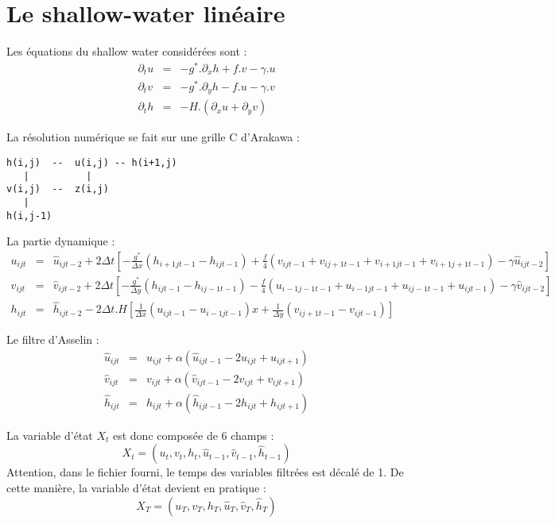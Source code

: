 \documentclass[a4paper,12pt]{article}
\begin{document}
\section{Le shallow-water linéaire\label{sec:lin}}
Les équations du shallow water considérées sont :
\begin{eqnarray}
\partial_tu & = & -g^*.\partial_xh + f . v - \gamma . u \nonumber \\
\partial_tv & = & -g^*.\partial_yh - f . u - \gamma . v \label{shal-lin}\\
\partial_th & = & - H.(\partial_xu + \partial_yv) \nonumber
\end{eqnarray}

La résolution numérique se fait sur une grille C d'Arakawa  :
\begin{verbatim}
h(i,j)  --  u(i,j) -- h(i+1,j)
   |          |
v(i,j)  --  z(i,j)
   |
h(i,j-1) 
\end{verbatim}

La partie dynamique :
\begingroup\footnotesize
\begin{eqnarray*}
u_{ijt} & = & \hat{u}_{ijt-2}+2\Delta t \left [
  -\frac{g^*}{\Delta x} (h_{i+1jt-1} - h_{ijt-1})
  +\frac{f  }{4}        (v_{ijt-1}+v_{ij+1t-1}+v_{i+1jt-1}+v_{i+1j+1t-1})
  -\gamma                \hat{u}_{ijt-2} \right ]\\
v_{ijt} & = & \hat{v}_{ijt-2}+2\Delta t \left [
  -\frac{g^*}{\Delta y} (h_{ijt-1} - h_{ij-1t-1})
  -\frac{f  }{4}        (u_{i-1j-1t-1}+u_{i-1jt-1}+u_{ij-1t-1}+u_{ijt-1})
  -\gamma                \hat{v}_{ijt-2} \right ]\\
h_{ijt} & = & \hat{h}_{ijt-2}-2\Delta t . H \left [ 
    \frac{1}{\Delta x} (u_{ijt-1} - u_{i-1jt-1}) 
x  + \frac{1}{\Delta y} (v_{ij+1t-1} - v_{ijt-1}) \right ]
\end{eqnarray*}
\endgroup

Le filtre d'Asselin :
\begin{eqnarray*}
\hat{u}_{ijt} & = & u_{ijt} + \alpha(\hat{u}_{ijt-1} - 2 u_{ijt} + u_{ijt+1}) \\
\hat{v}_{ijt} & = & v_{ijt} + \alpha(\hat{v}_{ijt-1} - 2 v_{ijt} + v_{ijt+1}) \\
\hat{h}_{ijt} & = & h_{ijt} + \alpha(\hat{h}_{ijt-1} - 2 h_{ijt} + h_{ijt+1})
\end{eqnarray*}


La variable d'état $X_t$ est donc composée de 6 champs :
$$
X_t=(u_t,v_t,h_t,\hat{u}_{t-1},\hat{v}_{t-1},\hat{h}_{t-1})
$$
Attention, dans le fichier fourni, le temps des variables filtrées est décalé de 1. De cette manière, la variable d'état devient en pratique :
$$
X_T=(u_T,v_T,h_T,\hat{u}_T,\hat{v}_T,\hat{h}_T)
$$
\end{document}

